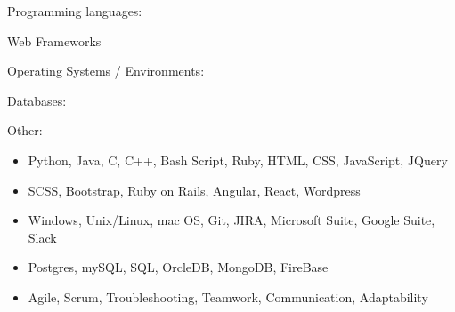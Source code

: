 \vspace*{-5mm}
\begin{cventries}
  \cventry{}{}{}{}
    {
        \begin{minipage}[left]{50mm}
            \begin{cvitems}
                \item {Programming languages:}
                \item {Web Frameworks}
                \item {Operating Systems / Environments:}
                \item {Databases:}
                \item {Other:}
            \end{cvitems}
        \end{minipage}
        \begin{minipage}[Left]{115mm}
        \vspace*{-2mm}
            \begin{itemize}
                \item[] Python, Java, C, C++, Bash Script, Ruby, HTML, CSS, JavaScript, JQuery
                \item[] SCSS, Bootstrap, Ruby on Rails, Angular, React, Wordpress
                \item[] Windows, Unix/Linux, mac OS, Git, JIRA, Microsoft Suite, Google Suite, Slack
                \item[] Postgres, mySQL, SQL, OrcleDB, MongoDB, FireBase
                \item[] Agile, Scrum, Troubleshooting, Teamwork, Communication, Adaptability
            \end{itemize}
        \end{minipage}
    }
    \end{cventries}
    \vspace*{-4mm}

